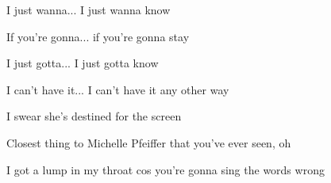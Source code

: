 \begin{song}
\bigskip

\Chorus \par

\bigskip

I just wanna... I just wanna know  \par
{} If you're gonna... if you're gonna stay  \par
{} I just gotta... I just gotta know  \par
{}I can't have it... I can't have it any other way \par

\bigskip

 \par
I  swear she's destined for the screen \par
{}Closest thing to Michelle Pfeiffer that you've ever seen, oh \par

\bigskip


\Chorus {} \par

\bigskip

I got a lump in my throat cos you're gonna sing the words wrong \par

\end{song}
